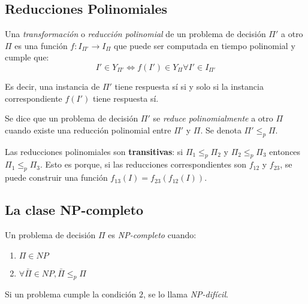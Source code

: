 \subsection{Reducciones Polinomiales}
\label{reducciones}

Una \textit{transformación} o \textit{reducción polinomial} de un problema de decisión $\Pi'$ a otro $\Pi$ es una función $f: I_{\Pi'} \longrightarrow I_{\Pi}$ que puede ser computada en tiempo polinomial y cumple que:
$$I' \in Y_{\Pi'} \iff f(I') \in Y_{\Pi} \forall I' \in I_{\Pi'}$$

Es decir, una instancia de $\Pi'$ tiene respuesta sí si y solo si la instancia correspondiente $f(I')$ tiene respuesta sí.

Se dice que un problema de decisión $\Pi'$ se \textit{reduce polinomialmente} a otro $\Pi$ cuando existe una reducción polinomial entre $\Pi'$ y $\Pi$. Se denota $\Pi' \leq_p \Pi$.

Las reducciones polinomiales son \textbf{transitivas}: si $\Pi_1 \leq_p \Pi_2$ y $\Pi_2 \leq_p \Pi_3$ entonces $\Pi_1 \leq_p \Pi_3$. Esto es porque, si las reducciones correspondientes son $f_{12}$ y $f_{23}$, se puede construir una función $f_{13}(I) = f_{23}(f_{12}(I))$.

\subsection{La clase NP-completo}
\label{np-completo}
\label{np-hard}

Un problema de decisión $\Pi$ es \textit{NP-completo} cuando:
\begin{enumerate}
    \item $\Pi \in NP$
    \item $\forall \bar{\Pi} \in NP, \bar{\Pi} \leq_p \Pi$
\end{enumerate}

Si un problema cumple la condición $2$, se lo llama \textit{NP-difícil}.

